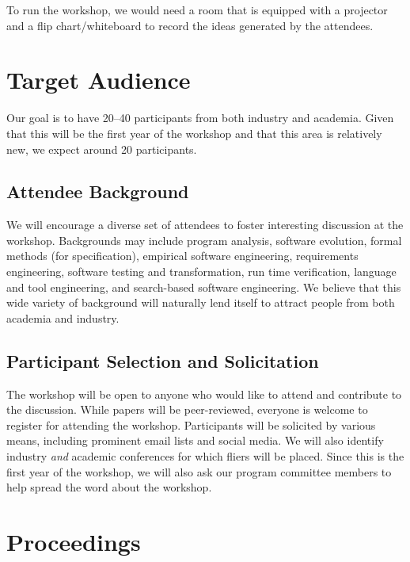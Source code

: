 \documentclass[10pt, conference]{IEEEtran}
\begin{document}
To run the workshop, we would need a room that is equipped with a projector and a flip chart/whiteboard to record the ideas generated by the attendees.

\section{Target Audience}

Our goal is to have 20--40 participants from both industry and academia. Given that this will be the first year of the workshop and that this area is relatively new, we expect around 20 participants.

\subsection{Attendee Background} 

We will encourage a diverse set of attendees to foster interesting discussion at the workshop. Backgrounds may include program analysis, software evolution, formal methods (for specification), empirical software engineering, requirements engineering, software testing and transformation, run time verification, language and tool engineering, and search-based software engineering. We believe that this wide variety of background will naturally lend itself to attract people from both academia and industry.

\subsection{Participant Selection and Solicitation}

The workshop will be open to anyone who would like to attend and contribute to the discussion. While papers will be peer-reviewed, everyone is welcome to register for attending the workshop. Participants will be solicited by various means, including prominent email lists and social media. We will also identify industry \emph{and} academic conferences for which fliers will be placed. Since this is the first year of the workshop, we will also ask our program committee members to help spread the word about the workshop.

\section{Proceedings}
\end{document}
